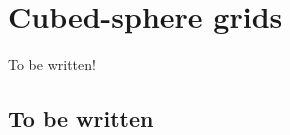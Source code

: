 
\chapter{Cubed-sphere grids}
\label{chp-cs-grids}
\citep{sadourny:1972}
\citep{ronchi:1996}
\citep{rancic:1996}
\citep{taylor:1997}
\citep{nair:2005}
\citep{lauritzen:2011}

To be written!
\section{To be written}

